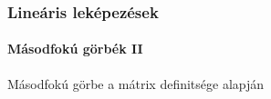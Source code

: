 \begin{frame}
  \frametitle{Lineáris leképezések}
  \framesubtitle{Másodfokú görbék II}

  \begin{block}{Másodfokú görbe a mátrix definitsége alapján}
  \end{block}

  
\end{frame}
